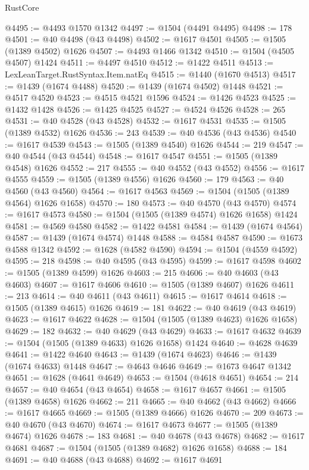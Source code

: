 \begin{lexlean}{RustCore}
\begin{coremodule}
@4495 := @4493 @1570 @1342
@4497 := @1504 (@4491 @4495)
@4498 := 178
@4501 := @40 @4498 (@43 @4498)
@4502 := @1617 @4501
@4505 := @1505 (@1389 @4502) @1626
@4507 := @4493 @1466 @1342
@4510 := @1504 (@4505 @4507) @1424
@4511 := @4497 @4510
@4512 := @1422 @4511
@4513 := LexLeanTarget.RustSyntax.Item.natEq
@4515 := @1440 (@1670 @4513)
@4517 := @1439 (@1674 @4488)
@4520 := @1439 (@1674 @4502) @1448
@4521 := @4517 @4520
@4523 := @4515 @4521 @1596
@4524 := @1426 @4523
@4525 := @1432 @1428
@4526 := @1425 @4525
@4527 := @4524 @4526
@4528 := 265
@4531 := @40 @4528 (@43 @4528)
@4532 := @1617 @4531
@4535 := @1505 (@1389 @4532) @1626
@4536 := 243
@4539 := @40 @4536 (@43 @4536)
@4540 := @1617 @4539
@4543 := @1505 (@1389 @4540) @1626
@4544 := 219
@4547 := @40 @4544 (@43 @4544)
@4548 := @1617 @4547
@4551 := @1505 (@1389 @4548) @1626
@4552 := 217
@4555 := @40 @4552 (@43 @4552)
@4556 := @1617 @4555
@4559 := @1505 (@1389 @4556) @1626
@4560 := 179
@4563 := @40 @4560 (@43 @4560)
@4564 := @1617 @4563
@4569 := @1504 (@1505 (@1389 @4564) @1626 @1658)
@4570 := 180
@4573 := @40 @4570 (@43 @4570)
@4574 := @1617 @4573
@4580 := @1504 (@1505 (@1389 @4574) @1626 @1658) @1424
@4581 := @4569 @4580
@4582 := @1422 @4581
@4584 := @1439 (@1674 @4564)
@4587 := @1439 (@1674 @4574) @1448
@4588 := @4584 @4587
@4590 := @1673 @4588 @1342
@4592 := @1628 (@4582 @4590)
@4594 := @1504 (@4559 @4592)
@4595 := 218
@4598 := @40 @4595 (@43 @4595)
@4599 := @1617 @4598
@4602 := @1505 (@1389 @4599) @1626
@4603 := 215
@4606 := @40 @4603 (@43 @4603)
@4607 := @1617 @4606
@4610 := @1505 (@1389 @4607) @1626
@4611 := 213
@4614 := @40 @4611 (@43 @4611)
@4615 := @1617 @4614
@4618 := @1505 (@1389 @4615) @1626
@4619 := 181
@4622 := @40 @4619 (@43 @4619)
@4623 := @1617 @4622
@4628 := @1504 (@1505 (@1389 @4623) @1626 @1658)
@4629 := 182
@4632 := @40 @4629 (@43 @4629)
@4633 := @1617 @4632
@4639 := @1504 (@1505 (@1389 @4633) @1626 @1658) @1424
@4640 := @4628 @4639
@4641 := @1422 @4640
@4643 := @1439 (@1674 @4623)
@4646 := @1439 (@1674 @4633) @1448
@4647 := @4643 @4646
@4649 := @1673 @4647 @1342
@4651 := @1628 (@4641 @4649)
@4653 := @1504 (@4618 @4651)
@4654 := 214
@4657 := @40 @4654 (@43 @4654)
@4658 := @1617 @4657
@4661 := @1505 (@1389 @4658) @1626
@4662 := 211
@4665 := @40 @4662 (@43 @4662)
@4666 := @1617 @4665
@4669 := @1505 (@1389 @4666) @1626
@4670 := 209
@4673 := @40 @4670 (@43 @4670)
@4674 := @1617 @4673
@4677 := @1505 (@1389 @4674) @1626
@4678 := 183
@4681 := @40 @4678 (@43 @4678)
@4682 := @1617 @4681
@4687 := @1504 (@1505 (@1389 @4682) @1626 @1658)
@4688 := 184
@4691 := @40 @4688 (@43 @4688)
@4692 := @1617 @4691

\end{coremodule}
\end{lexlean}
